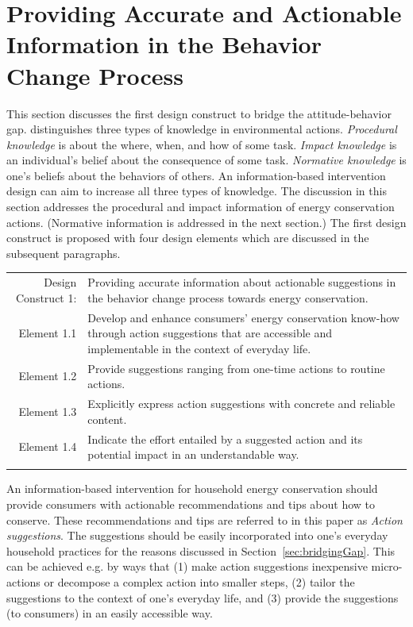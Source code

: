 \documentclass[a4paper,10pt]{article}
\begin{document}
\section{Providing Accurate and Actionable Information in the Behavior Change Process}
\label{sec:information}

This section discusses the first design construct to bridge the attitude-behavior gap. \citet{Schultz2002} distinguishes three types of knowledge in environmental actions. \textit{Procedural knowledge} is about the where, when, and how of some task. \textit{Impact knowledge} is an individual's belief about the consequence of some task. \textit{Normative knowledge} is one's beliefs about the behaviors of others. An information-based intervention design can aim to increase %
all three types of knowledge. The discussion in this section addresses the procedural and impact information of energy conservation actions. (Normative information is addressed in the next section.) The first design construct is proposed with four design elements which are discussed in the subsequent paragraphs. 

\begin{table}[h!]
\def\arraystretch{1.5}
\begin{tabularx}{\textwidth}{!{\color{gray!40}\vrule} r X !{\color{gray!40}\vrule}}
\hline
{} Design Construct 1:  &  Providing accurate information about actionable suggestions in the behavior change process towards energy conservation. \\  \hline
Element 1.1 & Develop and enhance consumers' energy conservation know-how through action suggestions that are accessible and implementable in the context of everyday life.\\
Element 1.2 & Provide suggestions ranging from one-time actions to routine actions.\\
Element 1.3 & Explicitly express action suggestions with concrete and reliable content.\\
Element 1.4 & Indicate the effort entailed by a suggested action and its potential impact in an understandable way.\\ \hline
\end{tabularx}
\end{table}


An information-based intervention for household energy conservation should provide consumers with actionable recommendations and tips about how to conserve. These recommendations and tips are referred to in this paper as \textit{Action suggestions}. The suggestions should be easily incorporated into one's everyday household practices for the reasons discussed in Section~\ref{sec:bridgingGap}. This can be achieved e.g. by ways that (1) make action suggestions inexpensive micro-actions or decompose a complex action into smaller steps, (2) tailor the suggestions to the context of one's everyday life, and (3) provide the suggestions (to consumers) in an easily accessible way. 
\end{document}
